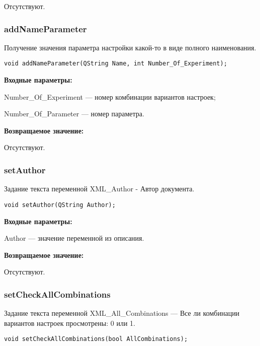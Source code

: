 \documentclass[a4paper,12pt]{article}
\begin{document}
Отсутствуют.


\subsubsection{addNameParameter}\label{addNameParameter}

Получение значения параметра настройки какой-то в виде полного наименования.


\begin{lstlisting}[label=code_syntax_addNameParameter,caption=Синтаксис]
void addNameParameter(QString Name, int Number_Of_Experiment);
\end{lstlisting}

\textbf{Входные параметры:}

Number\_Of\_Experiment --- номер комбинации вариантов настроек;

Number\_Of\_Parameter --- номер параметра.

\textbf{Возвращаемое значение:}

Отсутствуют.


\subsubsection{setAuthor}\label{setAuthor}

Задание текста переменной XML\_Author - Автор документа.


\begin{lstlisting}[label=code_syntax_setAuthor,caption=Синтаксис]
void setAuthor(QString Author);
\end{lstlisting}

\textbf{Входные параметры:}

Author --- значение переменной из описания.

\textbf{Возвращаемое значение:}

Отсутствуют.


\subsubsection{setCheckAllCombinations}\label{setCheckAllCombinations}

Задание текста переменной  XML\_All\_Combinations --- Все ли комбинации вариантов настроек просмотрены: 0 или 1.


\begin{lstlisting}[label=code_syntax_setCheckAllCombinations,caption=Синтаксис]
void setCheckAllCombinations(bool AllCombinations);
\end{lstlisting}
\end{document}
